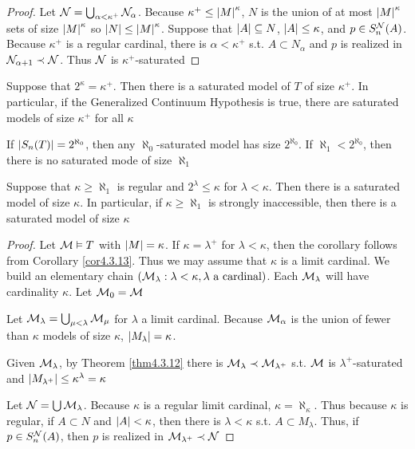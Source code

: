 \documentclass[11pt]{article}
\begin{document}
\begin{proof}
Let \(\mathcal{N}=\bigcup_{\alpha<\kappa^+}\mathcal{N}_\alpha\). Because \(\kappa^+\le\abs{M}^\kappa\), \(N\) is the union of at most \(\abs{M}^\kappa\)
sets of size \(\abs{M}^\kappa\) so \(\abs{N}\le\abs{M}^\kappa\). Suppose that \(\abs{A}\subseteq N\), \(\abs{A}\le\kappa\),
and \(p\in S_n^{\mathcal{N}}(A)\). Because \(\kappa^+\) is a regular cardinal, there is \(\alpha<\kappa^+\) s.t. \(A\subset N_\alpha\)
and \(p\) is realized in \(\mathcal{N}_{\alpha+1}\prec\mathcal{N}\). Thus \(\mathcal{N}\) is \(\kappa^+\)-saturated
\end{proof}

\begin{corollary}[]
\label{cor4.3.13}
Suppose that \(2^\kappa=\kappa^+\). Then there is a saturated model of \(T\) of size \(\kappa^+\). In particular,
if the Generalized Continuum Hypothesis is true, there are saturated models of size \(\kappa^+\) for
all \(\kappa\)
\end{corollary}

If \(\abs{S_n(T)}=2^{\aleph_0}\), then any \(\aleph_0\)-saturated model has size \(2^{\aleph_0}\).
If \(\aleph_1<2^{\aleph_0}\), then there is no saturated mode of size \(\aleph_1\)

\begin{corollary}[]
Suppose that \(\kappa\ge\aleph_1\) is regular and \(2^\lambda\le\kappa\) for \(\lambda<\kappa\). Then there is a saturated model of
size \(\kappa\). In particular, if \(\kappa\ge\aleph_1\) is strongly inaccessible, then there is a saturated model of
size \(\kappa\)
\end{corollary}

\begin{proof}
Let \(\mathcal{M}\vDash T\) with \(\abs{M}=\kappa\). If \(\kappa=\lambda^+\) for \(\lambda<\kappa\), then the corollary follows from
Corollary \ref{cor4.3.13}. Thus we may assume that \(\kappa\) is a limit cardinal. We build an elementary
chain \((\mathcal{M}_\lambda:\lambda<\kappa,\lambda\text{ a cardinal})\). Each \(\mathcal{M}_\lambda\) will have cardinality \(\kappa\). Let \(\mathcal{M}_0=\mathcal{M}\)

Let \(\mathcal{M}_\lambda=\bigcup_{\mu<\lambda}\mathcal{M}_\mu\) for \(\lambda\) a limit cardinal. Because \(\mathcal{M}_\alpha\) is the union of fewer than \(\kappa\)
models of size \(\kappa\), \(\abs{M_\lambda}=\kappa\).

Given \(\mathcal{M}_\lambda\), by Theorem \ref{thm4.3.12} there is \(\mathcal{M}_\lambda\prec\mathcal{M}_{\lambda^+}\) s.t. \(\mathcal{M}\) is \(\lambda^+\)-saturated
and \(\abs{M_{\lambda^+}}\le\kappa^\lambda=\kappa\)

Let \(\mathcal{N}=\bigcup\mathcal{M}_\lambda\). Because \(\kappa\) is a regular limit cardinal, \(\kappa=\aleph_\kappa\). Thus because \(\kappa\) is regular,
if \(A\subset N\) and \(\abs{A}<\kappa\), then there is \(\lambda<\kappa\) s.t. \(A\subset M_\lambda\). Thus,
if \(p\in S_n^{\mathcal{N}}(A)\), then \(p\) is realized in \(\mathcal{M}_{\lambda^+}\prec\mathcal{N}\)
\end{proof}
\end{document}
